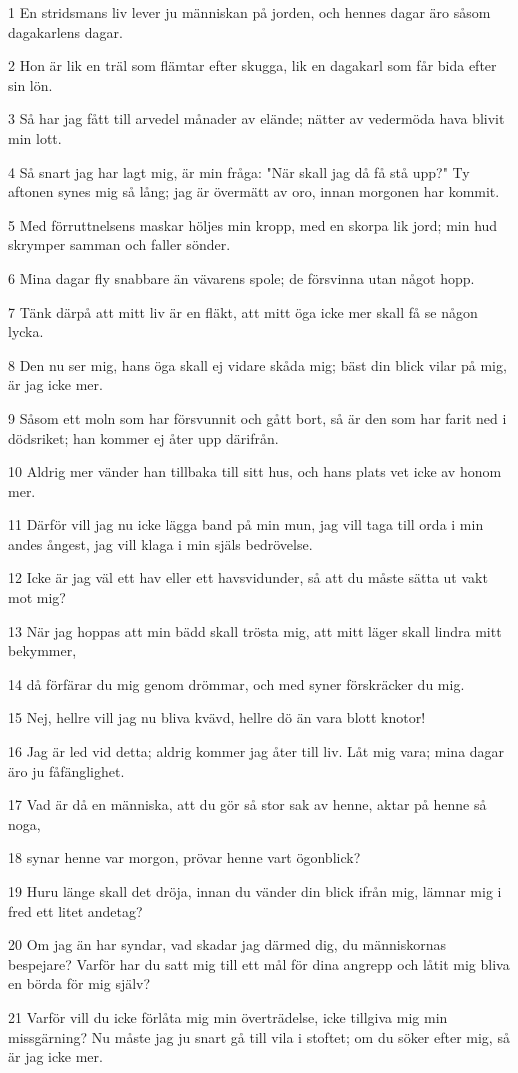 \par 1 En stridsmans liv lever ju människan på jorden, och hennes dagar äro såsom dagakarlens dagar.
\par 2 Hon är lik en träl som flämtar efter skugga, lik en dagakarl som får bida efter sin lön.
\par 3 Så har jag fått till arvedel månader av elände; nätter av vedermöda hava blivit min lott.
\par 4 Så snart jag har lagt mig, är min fråga: "När skall jag då få stå upp?" Ty aftonen synes mig så lång; jag är övermätt av oro, innan morgonen har kommit.
\par 5 Med förruttnelsens maskar höljes min kropp, med en skorpa lik jord; min hud skrymper samman och faller sönder.
\par 6 Mina dagar fly snabbare än vävarens spole; de försvinna utan något hopp.
\par 7 Tänk därpå att mitt liv är en fläkt, att mitt öga icke mer skall få se någon lycka.
\par 8 Den nu ser mig, hans öga skall ej vidare skåda mig; bäst din blick vilar på mig, är jag icke mer.
\par 9 Såsom ett moln som har försvunnit och gått bort, så är den som har farit ned i dödsriket; han kommer ej åter upp därifrån.
\par 10 Aldrig mer vänder han tillbaka till sitt hus, och hans plats vet icke av honom mer.
\par 11 Därför vill jag nu icke lägga band på min mun, jag vill taga till orda i min andes ångest, jag vill klaga i min själs bedrövelse.
\par 12 Icke är jag väl ett hav eller ett havsvidunder, så att du måste sätta ut vakt mot mig?
\par 13 När jag hoppas att min bädd skall trösta mig, att mitt läger skall lindra mitt bekymmer,
\par 14 då förfärar du mig genom drömmar, och med syner förskräcker du mig.
\par 15 Nej, hellre vill jag nu bliva kvävd, hellre dö än vara blott knotor!
\par 16 Jag är led vid detta; aldrig kommer jag åter till liv. Låt mig vara; mina dagar äro ju fåfänglighet.
\par 17 Vad är då en människa, att du gör så stor sak av henne, aktar på henne så noga,
\par 18 synar henne var morgon, prövar henne vart ögonblick?
\par 19 Huru länge skall det dröja, innan du vänder din blick ifrån mig, lämnar mig i fred ett litet andetag?
\par 20 Om jag än har syndar, vad skadar jag därmed dig, du människornas bespejare? Varför har du satt mig till ett mål för dina angrepp och låtit mig bliva en börda för mig själv?
\par 21 Varför vill du icke förlåta mig min överträdelse, icke tillgiva mig min missgärning? Nu måste jag ju snart gå till vila i stoftet; om du söker efter mig, så är jag icke mer.


